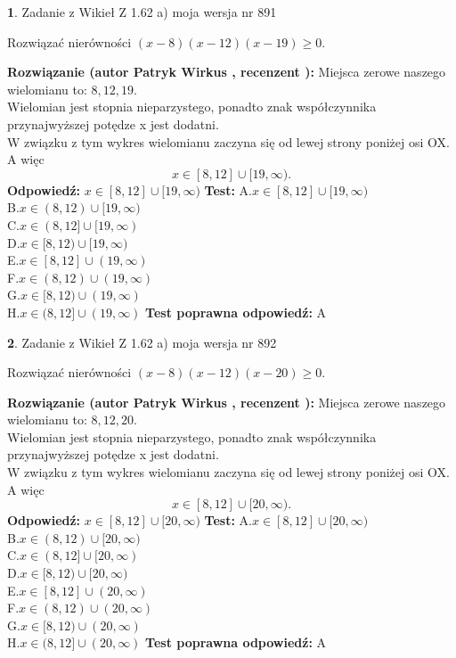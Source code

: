 \documentclass[12pt, a4paper]{article}
\theoremstyle{definition} %
\newtheorem{zad}{}
\newcommand{\zadStart}[1]{\begin{zad}#1\newline}
\newcommand{\zadStop}{\end{zad}}
\newcommand{\rozwStart}[2]{\noindent \textbf{Rozwiązanie (autor #1 , recenzent #2): }\newline}
\newcommand{\rozwStop}{\newline}
\newcommand{\odpStart}{\noindent \textbf{Odpowiedź:}\newline}
\newcommand{\odpStop}{\newline}
\newcommand{\testStart}{\noindent \textbf{Test:}\newline}
\newcommand{\testStop}{\newline}
\newcommand{\kluczStart}{\noindent \textbf{Test poprawna odpowiedź:}\newline}
\newcommand{\kluczStop}{\newline}
\begin{document}
\zadStart{Zadanie z Wikieł Z 1.62 a) moja wersja nr 891}

Rozwiązać nierówności $(x-8)(x-12)(x-19)\ge0$.
\zadStop
\rozwStart{Patryk Wirkus}{}
Miejsca zerowe naszego wielomianu to: $8, 12, 19$.\\
Wielomian jest stopnia nieparzystego, ponadto znak współczynnika przy\linebreak najwyższej potędze x jest dodatni.\\ W związku z tym wykres wielomianu zaczyna się od lewej strony poniżej osi OX. A więc $$x \in [8,12] \cup [19,\infty).$$
\rozwStop
\odpStart
$x \in [8,12] \cup [19,\infty)$
\odpStop
\testStart
A.$x \in [8,12] \cup [19,\infty)$\\
B.$x \in (8,12) \cup [19,\infty)$\\
C.$x \in (8,12] \cup [19,\infty)$\\
D.$x \in [8,12) \cup [19,\infty)$\\
E.$x \in [8,12] \cup (19,\infty)$\\
F.$x \in (8,12) \cup (19,\infty)$\\
G.$x \in [8,12) \cup (19,\infty)$\\
H.$x \in (8,12] \cup (19,\infty)$
\testStop
\kluczStart
A
\kluczStop



\zadStart{Zadanie z Wikieł Z 1.62 a) moja wersja nr 892}

Rozwiązać nierówności $(x-8)(x-12)(x-20)\ge0$.
\zadStop
\rozwStart{Patryk Wirkus}{}
Miejsca zerowe naszego wielomianu to: $8, 12, 20$.\\
Wielomian jest stopnia nieparzystego, ponadto znak współczynnika przy\linebreak najwyższej potędze x jest dodatni.\\ W związku z tym wykres wielomianu zaczyna się od lewej strony poniżej osi OX. A więc $$x \in [8,12] \cup [20,\infty).$$
\rozwStop
\odpStart
$x \in [8,12] \cup [20,\infty)$
\odpStop
\testStart
A.$x \in [8,12] \cup [20,\infty)$\\
B.$x \in (8,12) \cup [20,\infty)$\\
C.$x \in (8,12] \cup [20,\infty)$\\
D.$x \in [8,12) \cup [20,\infty)$\\
E.$x \in [8,12] \cup (20,\infty)$\\
F.$x \in (8,12) \cup (20,\infty)$\\
G.$x \in [8,12) \cup (20,\infty)$\\
H.$x \in (8,12] \cup (20,\infty)$
\testStop
\kluczStart
A
\kluczStop
\end{document}
